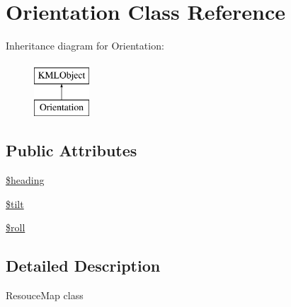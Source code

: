 \hypertarget{classOrientation}{
\section{Orientation Class Reference}
\label{d3/d38/classOrientation}
}
Inheritance diagram for Orientation:\begin{figure}[H]
\begin{center}
\leavevmode
\includegraphics[height=2.000000cm]{d3/d38/classOrientation}
\end{center}
\end{figure}
\subsection*{Public Attributes}
\begin{DoxyCompactItemize}
\item 
\hyperlink{classOrientation_ac90091d58ab5df8befd33c099e0cb6c8}{\$heading}
\item 
\hyperlink{classOrientation_ad39c193a6ab368858ad5c7e28d339488}{\$tilt}
\item 
\hyperlink{classOrientation_a76d46ae5280f3ec27adbc825000db303}{\$roll}
\end{DoxyCompactItemize}


\subsection{Detailed Description}
ResouceMap class 

